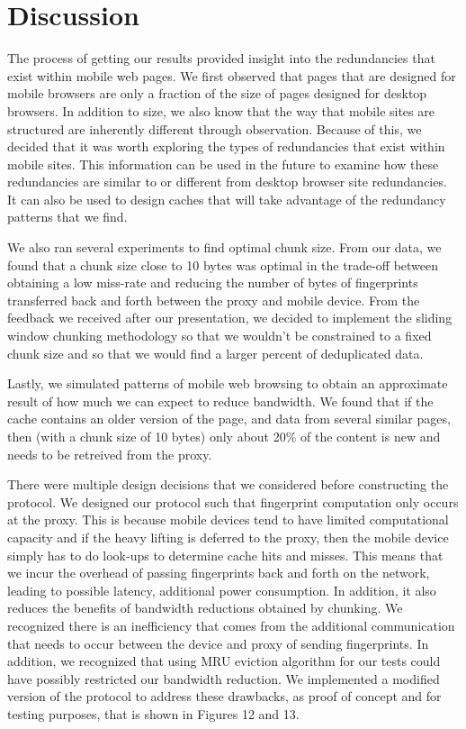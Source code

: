 \section{Discussion}
\label{sec:discussion}
The process of getting our results provided insight into the redundancies that exist within mobile web pages. We first observed that pages that are designed for mobile browsers are only a fraction of the size of pages designed for desktop browsers. In addition to size, we also know that the way that mobile sites are structured are inherently different through observation. Because of this, we decided that it was worth exploring the types of redundancies that exist within mobile sites. This information can be used in the future to examine how these redundancies are similar to or different from desktop browser site redundancies. It can also be used to design caches that will take advantage of the redundancy patterns that we find. 

We also ran several experiments to find optimal chunk size. From our data, we found that a chunk size close to 10 bytes was optimal in the trade-off between obtaining a low miss-rate and reducing the number of bytes of fingerprints transferred back and forth between the proxy and mobile device. From the feedback we received after our presentation, we decided to implement the sliding window chunking methodology so that we wouldn't be constrained to a fixed chunk size and so that we would find a larger percent of deduplicated data. 

Lastly, we simulated patterns of mobile web browsing to obtain an approximate result of how much we can expect to reduce bandwidth. We found that if the cache contains an older version of the page, and data from several similar pages, then (with a chunk size of 10 bytes) only about 20\% of the content is new and needs to be retreived from the proxy. 

There were multiple design decisions that we considered before constructing the protocol. We designed our protocol such that fingerprint computation only occurs at the proxy. This is because mobile devices tend to have limited computational capacity and if the heavy lifting is deferred to the proxy, then the mobile device simply has to do look-ups to determine cache hits and misses. This means that we incur the overhead of passing fingerprints back and forth on the network, leading to possible latency, additional power consumption. In addition, it also reduces the benefits of bandwidth reductions obtained by chunking. We recognized there is an inefficiency that comes from the additional communication that needs to occur between the device and proxy of sending fingerprints. In addition, we recognized that using MRU eviction algorithm for our tests could have possibly restricted our bandwidth reduction. We implemented a modified version of the protocol to address these drawbacks, as proof of concept and for testing purposes, that is shown in Figures 12 and 13. 

